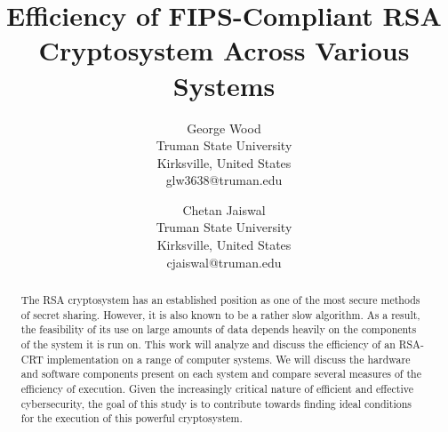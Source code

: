 \documentclass[journal]{IEEEtran}
\begin{document}
%
\title{Efficiency of FIPS-Compliant RSA Cryptosystem Across Various Systems}
%
%
%

\author{%
\begin{tabular}{c} George Wood \\ Truman State University \\ Kirksville, United States \\ glw3638@truman.edu \end{tabular} \and \hspace{2in}
\begin{tabular}{c} Chetan Jaiswal \\ Truman State University \\ Kirksville, United States \\cjaiswal@truman.edu \end{tabular}}

\maketitle

\begin{abstract}
The RSA cryptosystem has an established position as one of the most secure methods of secret sharing. However, it is also known to be a rather slow algorithm. As a result, the feasibility of its use on large amounts of data depends heavily on the components of the system it is run on. This work will analyze and discuss the efficiency of an RSA-CRT implementation on a range of computer systems. We will discuss the hardware and software components present on each system and compare several measures of the efficiency of execution. Given the increasingly critical nature of efficient and effective cybersecurity, the goal of this study is to contribute towards finding ideal conditions for the execution of this powerful cryptosystem.
\end{abstract}
\end{document}
